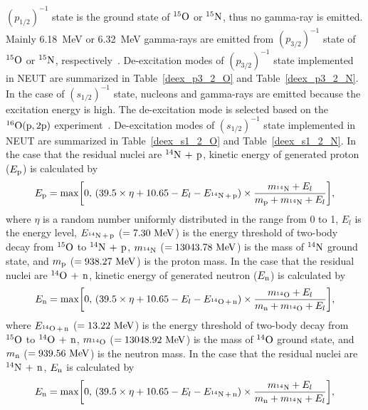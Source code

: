 \hs
$(p_{1/2})^{-1}$ state is the ground state of $^{15}{\rm O}$ or $^{15}{\rm N}$, thus no gamma-ray is emitted.
Mainly 6.18~MeV or 6.32~MeV gamma-rays are emitted from $(p_{3/2})^{-1}$ state of $^{15}{\rm O}$ or $^{15}{\rm N}$, respectively~\cite{1994Leuschner,1991Ajzenberg}.
De-excitation modes of $(p_{3/2})^{-1}$ state implemented in NEUT are summarized in Table~\ref{deex_p3_2_O} and Table~\ref{deex_p3_2_N}.
In the case of $(s_{1/2})^{-1}$ state, nucleons and gamma-rays are emitted because the excitation energy is high.
The de-excitation mode is selected based on the $^{16}{\rm O}({\rm p}, 2{\rm p})$ experiment~\cite{2006Kobayashi}.
De-excitation modes of $(s_{1/2})^{-1}$ state implemented in NEUT are summarized in Table~\ref{deex_s1_2_O} and Table~\ref{deex_s1_2_N}.
In the case that the residual nuclei are $^{14}{\rm N}\,+\,{\rm p}$, kinetic energy of generated proton ($E_{{\rm p}}$) is calculated by
\begin{eqnarray}\label{Ep_14Np}
	E_{{\rm p}} = {\rm max}\bigg[0,\,(39.5 \times \eta + 10.65 - E_{l} - E_{^{14}{\rm N}\,+\,{\rm p}}) \times {m_{^{14}{\rm N}} + E_{l} \over m_{{\rm p}} + m_{^{14}{\rm N}} + E_{l}}\bigg],
\end{eqnarray}
where $\eta$ is a random number uniformly distributed in the range from 0 to 1, $E_{l}$ is the energy level, $E_{^{14}{\rm N}\,+\,{\rm p}}$ ($=7.30~{\rm MeV}$) is the energy threshold of two-body decay from $^{15}{\rm O}$ to $^{14}{\rm N}\,+\,{\rm p}$, $m_{^{14}{\rm N}}$ ($=13043.78~{\rm MeV}$) is the mass of $^{14}{\rm N}$ ground state, and $m_{{\rm p}}$ ($=938.27~{\rm MeV}$) is the proton mass.
In the case that the residual nuclei are $^{14}{\rm O}\,+\,{\rm n}$, kinetic energy of generated neutron ($E_{{\rm n}}$) is calculated by
\begin{eqnarray}\label{En_14On}
	E_{{\rm n}} = {\rm max}\bigg[0,\,(39.5 \times \eta + 10.65 - E_{l} - E_{^{14}{\rm O}\,+\,{\rm n}}) \times {m_{^{14}{\rm O}} + E_{l} \over m_{{\rm n}} + m_{^{14}{\rm O}} + E_{l}}\bigg],
\end{eqnarray}
where $E_{^{14}{\rm O}\,+\,{\rm n}}$ ($=13.22~{\rm MeV}$) is the energy threshold of two-body decay from $^{15}{\rm O}$ to $^{14}{\rm O}\,+\,{\rm n}$, $m_{^{14}{\rm O}}$ ($=13048.92~{\rm MeV}$) is the mass of $^{14}{\rm O}$ ground state, and $m_{{\rm n}}$ ($=939.56~{\rm MeV}$) is the neutron mass.
In the case that the residual nuclei are $^{14}{\rm N}\,+\,{\rm n}$, $E_{{\rm n}}$ is calculated by
\begin{eqnarray}\label{En_14Nn}
	E_{{\rm n}} = {\rm max}\bigg[0,\,(39.5 \times \eta + 10.65 - E_{l} - E_{^{14}{\rm N}\,+\,{\rm n}}) \times {m_{^{14}{\rm N}} + E_{l} \over m_{{\rm n}} + m_{^{14}{\rm N}} + E_{l}}\bigg],
\end{eqnarray}
